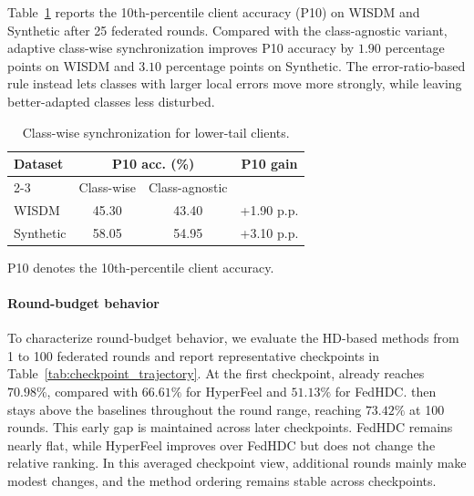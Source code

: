 \documentclass[lettersize,journal]{IEEEtran}
\newcommand{\rev}[1]{#1}
\begin{document}
\rev{Table~\ref{tab:classwise_tail_shared_delta} reports the 10th-percentile client accuracy (P10) on \textsc{WISDM} and Synthetic after 25 federated rounds.}
\rev{Compared with the class-agnostic variant, adaptive class-wise synchronization improves P10 accuracy by \(1.90\) percentage points on \textsc{WISDM} and \(3.10\) percentage points on Synthetic.}
\rev{The error-ratio-based rule instead lets classes with larger local errors move more strongly, while leaving better-adapted classes less disturbed.}

\begin{table}[t]
\centering
\caption{\rev{Class-wise synchronization for lower-tail clients.}}
\label{tab:classwise_tail_shared_delta}
\scriptsize
\setlength{\tabcolsep}{3pt}
\begin{tabular}{lccc}
\toprule
\rev{Dataset} & \multicolumn{2}{c}{\rev{P10 acc. (\%)}} & \rev{P10 gain} \\
\cmidrule(lr){2-3}
 & \rev{Class-wise} & \rev{Class-agnostic} &  \\
\midrule
\textsc{WISDM} & 45.30 & 43.40 & +1.90 p.p. \\
Synthetic & 58.05 & 54.95 & +3.10 p.p. \\
\bottomrule
\end{tabular}%
\vspace{0.2em}

\parbox{\columnwidth}{\footnotesize\rev{P10 denotes the 10th-percentile client accuracy.}}
\end{table}





\paragraph{\rev{Round-budget behavior}}
\rev{To characterize round-budget behavior, we evaluate the HD-based methods from 1 to 100 federated rounds and report representative checkpoints in Table~\ref{tab:checkpoint_trajectory}.}
\rev{At the first checkpoint, \Design already reaches \(70.98\%\), compared with \(66.61\%\) for HyperFeel and \(51.13\%\) for FedHDC.}
\rev{\Design then stays above the baselines throughout the round range, reaching \(73.42\%\) at 100 rounds.}
\rev{This early gap is maintained across later checkpoints.}
\rev{FedHDC remains nearly flat, while HyperFeel improves over FedHDC but does not change the relative ranking.}
\rev{In this averaged checkpoint view, additional rounds mainly make modest changes, and the method ordering remains stable across checkpoints.}
\end{document}
